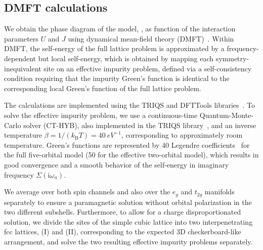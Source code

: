 \documentclass[aps,prb,twocolumn,superscriptaddress,10pt]{revtex4-1}
\newcommand{\pref}[1]{\prettyref{#1}}%
\newcommand{\iu}{\ensuremath{\mathrm{i}}} %
\newcommand{\eg}{\ensuremath{{e_g}}\xspace}
\newcommand{\ttg}{\ensuremath{{t_{2g}}}\xspace}
\begin{document}
\subsection{DMFT calculations}
\label{sec:dmft}

We obtain the phase diagram of the model, \pref{eq:ham}, as function of the interaction parameters $U$ and $J$ using dynamical mean-field theory (DMFT)~\cite{georges_dynamical_1996}. Within DMFT, the self-energy of the full lattice problem is approximated by a frequency-dependent but local self-energy, which is obtained by mapping each symmetry-inequivalent site on an effective impurity problem, defined via a self-consistency condition requiring that the impurity Green's function is identical to the corresponding local Green's function of the full lattice problem.

The calculations are implemented using the TRIQS and DFTTools libraries~\cite{parcollet_triqs_2015, aichhorn_triqsdfttools_2016, solidmft}.
To solve the effective impurity problem, we use a continuous-time Quantum-Monte-Carlo solver (CT-HYB), also implemented in the TRIQS library~\cite{seth_triqscthyb_2016}, and an inverse temperature $\beta=1/(k_\text{B}T)=\SI{40}{eV^{-1}}$, corresponding to approximately room temperature. Green's functions are represented by 40 Legendre coefficients~\cite{boehnke_orthogonal_2011} for the full five-orbital model (50 for the effective two-orbital model), which results in good convergence and a smooth behavior of the self-energy in imaginary frequency $\Sigma(\iu\omega_n)$. 

We average over both spin channels and also over the \eg and \ttg manifolds separately
to ensure a paramagnetic solution without orbital polarization in the two different subshells.
Furthermore, to allow for a charge disproportionated solution, we divide the sites of the simple cubic lattice into two interpenetrating fcc lattices, (I) and (II), corresponding to the expected 3D checkerboard-like arrangement, and solve the two resulting effective impurity problems separately. 
\end{document}
